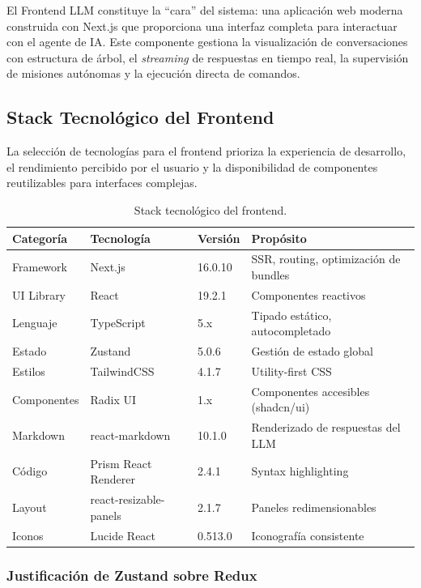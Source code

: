El Frontend LLM constituye la ``cara'' del sistema: una aplicación web moderna construida con Next.js que proporciona una interfaz completa para interactuar con el agente de IA. Este componente gestiona la visualización de conversaciones con estructura de árbol, el \textit{streaming} de respuestas en tiempo real, la supervisión de misiones autónomas y la ejecución directa de comandos.

\subsection{Stack Tecnológico del Frontend}

La selección de tecnologías para el frontend prioriza la experiencia de desarrollo, el rendimiento percibido por el usuario y la disponibilidad de componentes reutilizables para interfaces complejas.

\begin{table}[H]
\centering
\renewcommand{\arraystretch}{1.2}
\begin{tabular}{|l|l|l|p{5cm}|}
\hline
\rowcolor[gray]{0.85}
\textbf{Categoría} & \textbf{Tecnología} & \textbf{Versión} & \textbf{Propósito} \\
\hline
Framework & Next.js & 16.0.10 & SSR, routing, optimización de bundles \\
\hline
UI Library & React & 19.2.1 & Componentes reactivos \\
\hline
Lenguaje & TypeScript & 5.x & Tipado estático, autocompletado \\
\hline
Estado & Zustand & 5.0.6 & Gestión de estado global \\
\hline
Estilos & TailwindCSS & 4.1.7 & Utility-first CSS \\
\hline
Componentes & Radix UI & 1.x & Componentes accesibles (shadcn/ui) \\
\hline
Markdown & react-markdown & 10.1.0 & Renderizado de respuestas del LLM \\
\hline
Código & Prism React Renderer & 2.4.1 & Syntax highlighting \\
\hline
Layout & react-resizable-panels & 2.1.7 & Paneles redimensionables \\
\hline
Iconos & Lucide React & 0.513.0 & Iconografía consistente \\
\hline
\end{tabular}
\caption{Stack tecnológico del frontend.}
\label{tab:stack_frontend}
\end{table}

\subsubsection{Justificación de Zustand sobre Redux}

